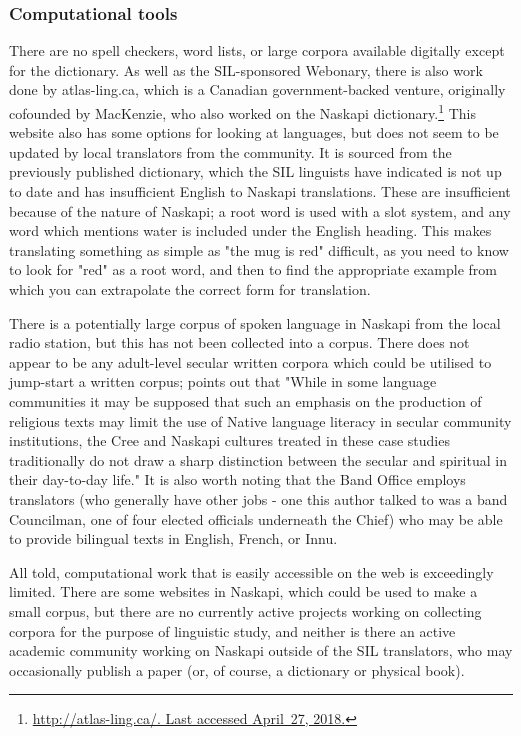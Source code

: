\subsubsection{Computational tools}

There are no spell checkers, word lists, or large corpora available digitally except for the dictionary. As well as the SIL-sponsored Webonary, there is also work done by atlas-ling.ca, which is a Canadian government-backed venture, originally cofounded by MacKenzie, who also worked on the Naskapi dictionary.\footnote{\href{http://atlas-ling.ca/}{http://atlas-ling.ca/. Last accessed April~27, 2018.}}
This website also has some options for looking at languages, but does not seem to be updated by local translators from the community. It is sourced from the previously published dictionary, which the SIL linguists have indicated is not up to date and has insufficient English to Naskapi translations. These are insufficient because of the nature of Naskapi; a root word is used with a slot system, and any word which mentions water is included under the English heading. This makes translating something as simple as "the mug is red" difficult, as you need to know to look for "red" as a root word, and then to find the appropriate example from which you can extrapolate the correct form for translation.

There is a potentially large corpus of spoken language in Naskapi from the local radio station, but this has not been collected into a corpus. There does not appear to be any adult-level secular written corpora which could be utilised to jump-start a written corpus; \citet{jancewicz2002applied} points out that "While in some language communities it may be supposed that such an emphasis on the production of religious texts may limit the use of Native language literacy in secular community institutions, the Cree and Naskapi cultures treated in these case studies traditionally do not draw a sharp distinction between the secular and spiritual in their day-to-day life." It is also worth noting that the Band Office employs translators (who generally have other jobs - one this author talked to was a band Councilman, one of four elected officials underneath the Chief) who may be able to provide bilingual texts in English, French, or Innu.

All told, computational work that is easily accessible on the web is exceedingly limited. There are some websites in Naskapi, which could be used to make a small corpus, but there are no currently active projects working on collecting corpora for the purpose of linguistic study, and neither is there an active academic community working on Naskapi outside of the SIL translators, who may occasionally publish a paper (or, of course, a dictionary or physical book).

